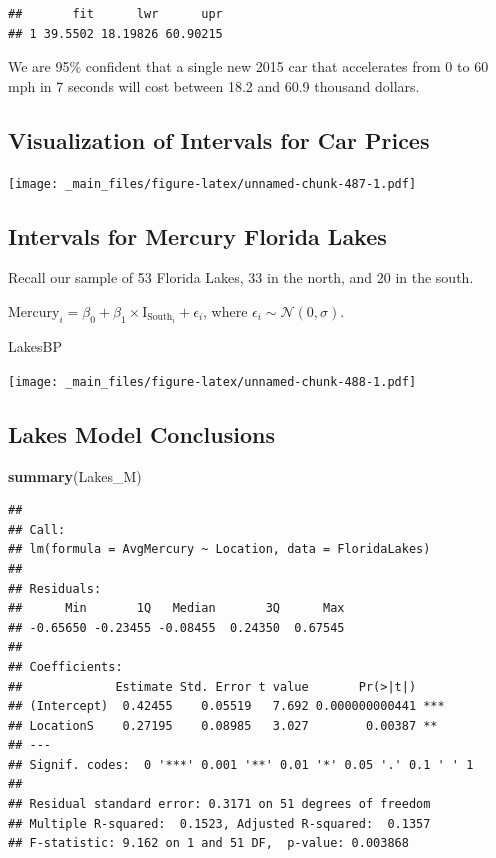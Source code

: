 \documentclass[]{book}
\newenvironment{Shaded}{\begin{snugshade}}{\end{snugshade}}
\newcommand{\KeywordTok}[1]{\textcolor[rgb]{0.13,0.29,0.53}{\textbf{#1}}}
\newcommand{\NormalTok}[1]{#1}
\begin{document}
\begin{verbatim}
##       fit      lwr      upr
## 1 39.5502 18.19826 60.90215
\end{verbatim}

We are 95\% confident that a single new 2015 car that accelerates from 0
to 60 mph in 7 seconds will cost between 18.2 and 60.9 thousand dollars.

\subsection{Visualization of Intervals for Car
Prices}\label{visualization-of-intervals-for-car-prices}

\texttt{[image: \_main\_files/figure-latex/unnamed-chunk-487-1.pdf]}

\subsection{Intervals for Mercury Florida
Lakes}\label{intervals-for-mercury-florida-lakes}

Recall our sample of 53 Florida Lakes, 33 in the north, and 20 in the
south.

\(\text{Mercury}_i = \beta_0 + \beta_1\times\text{I}_{\text{South}_i} + \epsilon_i\),
where \(\epsilon_i\sim\mathcal{N}(0, \sigma)\).

\begin{Shaded}
\begin{Highlighting}[]
\NormalTok{LakesBP}
\end{Highlighting}
\end{Shaded}

\texttt{[image: \_main\_files/figure-latex/unnamed-chunk-488-1.pdf]}

\subsection{Lakes Model Conclusions}\label{lakes-model-conclusions}

\begin{Shaded}
\begin{Highlighting}[]
\KeywordTok{summary}\NormalTok{(Lakes_M)}
\end{Highlighting}
\end{Shaded}

\begin{verbatim}
## 
## Call:
## lm(formula = AvgMercury ~ Location, data = FloridaLakes)
## 
## Residuals:
##      Min       1Q   Median       3Q      Max 
## -0.65650 -0.23455 -0.08455  0.24350  0.67545 
## 
## Coefficients:
##             Estimate Std. Error t value       Pr(>|t|)    
## (Intercept)  0.42455    0.05519   7.692 0.000000000441 ***
## LocationS    0.27195    0.08985   3.027        0.00387 ** 
## ---
## Signif. codes:  0 '***' 0.001 '**' 0.01 '*' 0.05 '.' 0.1 ' ' 1
## 
## Residual standard error: 0.3171 on 51 degrees of freedom
## Multiple R-squared:  0.1523, Adjusted R-squared:  0.1357 
## F-statistic: 9.162 on 1 and 51 DF,  p-value: 0.003868
\end{verbatim}
\end{document}
